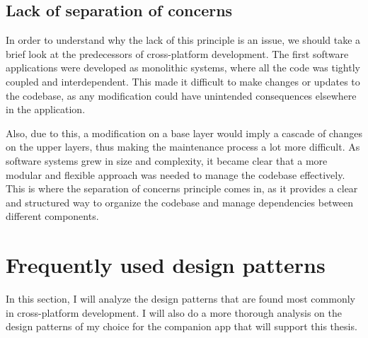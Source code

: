 \subsection{Lack of separation of concerns}
In order to understand why the lack of this principle is an issue, we should take a brief look at the predecessors of cross-platform development.
The first software applications were developed as monolithic systems, where all the code was tightly coupled and interdependent.
This made it difficult to make changes or updates to the codebase, as any modification could have unintended consequences elsewhere in the application.

\par
Also, due to this, a modification on a base layer would imply a cascade of changes on the upper layers, thus making the maintenance process a lot more difficult.
As software systems grew in size and complexity, it became clear that a more modular and flexible approach was needed to manage the codebase effectively.
This is where the separation of concerns principle comes in, 
as it provides a clear and structured way to organize the codebase and manage dependencies between different components.

\section{Frequently used design patterns}
\par
In this section, I will analyze the design patterns that are found most commonly in cross-platform development. 
I will also do a more thorough analysis on the design patterns of my choice for the companion app that will support this thesis.

